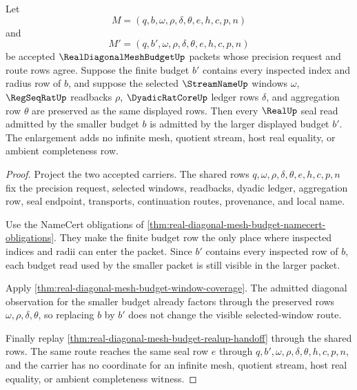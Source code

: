 \begin{theorem}
\label{thm:real-diagonal-mesh-budget-budget-monotonicity}
Let
$$
M=(q,b,\omega,\rho,\delta,\theta,e,h,c,p,n)
$$
and
$$
M'=(q,b',\omega,\rho,\delta,\theta,e,h,c,p,n)
$$
be accepted $\RealDiagonalMeshBudgetUp$ packets whose precision request and route rows agree. Suppose the finite budget $b'$ contains every inspected index and radius row of $b$, and suppose the selected $\StreamNameUp$ windows $\omega$, $\RegSeqRatUp$ readbacks $\rho$, $\DyadicRatCoreUp$ ledger rows $\delta$, and aggregation row $\theta$ are preserved as the same displayed rows. Then every $\RealUp$ seal read admitted by the smaller budget $b$ is admitted by the larger displayed budget $b'$. The enlargement adds no infinite mesh, quotient stream, host real equality, or ambient completeness row.
\end{theorem}
\begin{proof}
Project the two accepted carriers. The shared rows $q,\omega,\rho,\delta,\theta,e,h,c,p,n$ fix the precision request, selected windows, readbacks, dyadic ledger, aggregation row, seal endpoint, transports, continuation routes, provenance, and local name.

Use the NameCert obligations of \autoref{thm:real-diagonal-mesh-budget-namecert-obligations}. They make the finite budget row the only place where inspected indices and radii can enter the packet. Since $b'$ contains every inspected row of $b$, each budget read used by the smaller packet is still visible in the larger packet.

Apply \autoref{thm:real-diagonal-mesh-budget-window-coverage}. The admitted diagonal observation for the smaller budget already factors through the preserved rows $\omega,\rho,\delta,\theta$, so replacing $b$ by $b'$ does not change the visible selected-window route.

Finally replay \autoref{thm:real-diagonal-mesh-budget-realup-handoff} through the shared rows. The same route reaches the same seal row $e$ through $q,b',\omega,\rho,\delta,\theta,h,c,p,n$, and the carrier has no coordinate for an infinite mesh, quotient stream, host real equality, or ambient completeness witness.
\end{proof}

